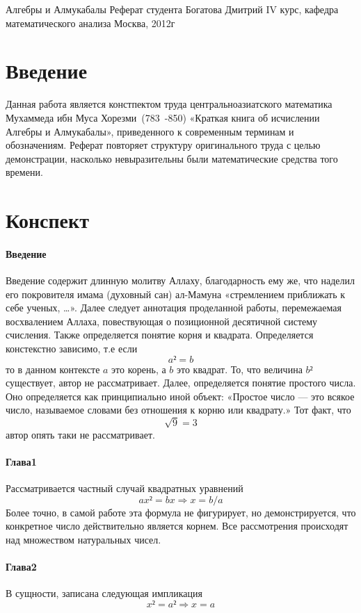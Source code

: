 \documentclass[unicode, 10pt, a4paper, oneside, fleqn]{article}
\begin{document}
          {Алгебры и Алмукабалы}
          {Реферат студента Богатова Дмитрий}
          {IV курс, кафедра математического анализа}
          {Москва, 2012г}
\section{Введение}
Данная работа является констпектом труда 
центральноазиатского математика Мухаммеда ибн Муса Хорезми~(783~-850)
«Краткая книга об исчислении Алгебры и Алмукабалы», приведенного к современным
терминам и обозначениям. Реферат повторяет структуру оригинального труда с целью 
демонстрации, насколько невыразительны были математические средства того времени.
\section{Конспект}
\paragraph{Введение}
 Введение содержит длинную молитву Аллаху, благодарность 
ему же, что наделил его покровителя имама (духовный сан) ал-Мамуна 
«стремлением приближать к себе ученых, …». Далее следует аннотация 
проделанной работы, перемежаемая восхвалением Аллаха, повествующая 
о позиционной десятичной систему счисления. Также определяется понятие 
корня и квадрата. Определяется констекстно зависимо, т.е если
\begin{displaymath}
  a² = b
\end{displaymath}
то в данном контексте $a$ это корень, а $b$ это квадрат. То, что величина
$b²$ существует, автор не рассматривает. Далее, определяется понятие простого числа.
Оно определяется как принципиально иной объект: «Простое число — это всякое число,
называемое словами без отношения к корню или квадрату.» Тот факт, что
$$ \sqrt{9} = 3 $$
автор опять таки не рассматривает.
\paragraph{Глава1}
 Рассматривается частный случай квадратных уравнений
 \begin{displaymath}
   ax² = bx ⇒x = b/a
 \end{displaymath}
Более точно, в самой работе эта формула не фигурирует, но демонстрируется, что конкретное 
число действительно является корнем. Все рассмотрения происходят над множеством 
натуральных чисел.
\paragraph{Глава2}
В сущности, записана следующая импликация 
\begin{displaymath}
  x² = a² ⇒ x = a
\end{displaymath}
\end{document}
